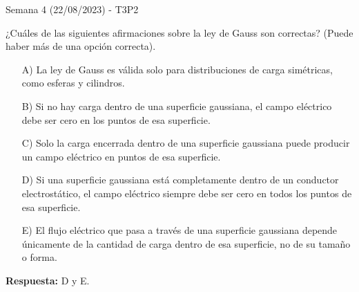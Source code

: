 \begin{frame}{Semana 4 (22/08/2023) - T3P2}
    
    ¿Cuáles de las siguientes afirmaciones sobre la ley de Gauss son correctas? (Puede haber más de una opción correcta).
    
    \begin{itemize}
        \item[A)] La ley de Gauss es válida solo para distribuciones de carga simétricas, como esferas y cilindros.

        \item[B)] Si no hay carga dentro de una superficie gaussiana, el campo eléctrico debe ser cero en los puntos de esa superficie.
        
        \item[C)] Solo la carga encerrada dentro de una superficie gaussiana puede producir un campo eléctrico en puntos de esa superficie.
        
        \item[D)] Si una superficie gaussiana está completamente dentro de un conductor electrostático, el campo eléctrico siempre debe ser cero en todos los puntos de esa superficie.
        
        \item[E)] El flujo eléctrico que pasa a través de una superficie gaussiana depende únicamente de la cantidad de carga dentro de esa superficie, no de su tamaño o forma.
    \end{itemize}
    
    \pause\bigskip\centering\textbf{Respuesta:} D y E.
    
\end{frame}

